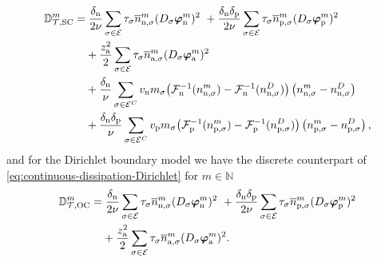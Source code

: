 \documentclass[10pt,a4paper, final]{article}
\newcommand{\reviewerTwo}[1]{\textcolor{black}{#1}}
\def\electrons{\text{n}}
\def\holes{\text{p}}
\def\ions{\text{a}}
\theoremstyle{definition}								%
\numberwithin{equation}{section}
\numberwithin{figure}{section}
\numberwithin{theorem}{section}
\begin{document}
\begin{equation} \label{eq:discrete-dissip-Schottky}
    \begin{split}
        \mathbb{D}_{\mathcal{T}, \reviewerTwo{\text{SC}}}^m
        =&\;  \frac{\delta_\electrons}{2\nu}  \sum_{ \sigma \in \mathcal{E} } \tau_\sigma  \overline{n}^{m}_{\electrons, \sigma}  (D_{\sigma} \boldsymbol{\varphi}_{\electrons}^m)^2
        ~
        + \frac{ \delta_\electrons \delta_\holes}{2\nu}  \sum_{ \sigma \in \mathcal{E} } \tau_\sigma  \overline{n}^{m}_{\holes, \sigma}  (D_{\sigma} \boldsymbol{\varphi}_{\holes}^m)^2\\
        ~
        &+ \frac{ z_{\ions}^2}{2}\sum_{\sigma \in \mathcal{E}} \tau_\sigma \overline{n}^{m}_{\ions,\sigma}  (D_{ \sigma} \boldsymbol{\varphi}_{\ions}^m)^2\\
        ~
        &+ \frac{\delta_\electrons}{\nu} \sum_{\sigma \in \mathcal{E}^C}  v_\electrons  m_\sigma  \bigl( \mathcal{F}^{-1}_\electrons (n_{\electrons, \sigma}^m) - \mathcal{F}^{-1}_\electrons  (n_{\electrons, \sigma}^D)  \bigr)  \left( n_{\electrons, \sigma}^m - n_{\electrons, \sigma}^D \right) \\
        ~
        &+ \frac{\delta_\electrons\delta_\holes}{\nu} \sum_{\sigma \in \mathcal{E}^C} v_\holes m_\sigma  \bigl(\mathcal{F}^{-1}_\holes (n_{\holes, \sigma}^m) - \mathcal{F}^{-1}_\holes  (n_{\holes, \sigma}^D)  \bigr)  \left( n_{\holes, \sigma}^m - n_{\holes, \sigma}^D \right),
    \end{split}
\end{equation}
and for the Dirichlet boundary model we have the discrete counterpart of \eqref{eq:continuous-dissipation-Dirichlet} for $m \in \mathbb{N}$
\begin{equation} \label{eq:discrete-dissip-Dirichlet}
    \begin{split}
        \mathbb{D}_{\mathcal{T}, \reviewerTwo{\text{OC}}}^m
        =&\;  \frac{\delta_\electrons}{2\nu}  \sum_{\sigma \in \mathcal{E}} \tau_\sigma  \overline{n}^{m}_{\electrons, \sigma}  (D_{\sigma} \boldsymbol{\varphi}_{\electrons}^m)^2
        ~
        + \frac{ \delta_\electrons \delta_\holes}{2\nu}  \sum_{\sigma \in \mathcal{E}} \tau_\sigma  \overline{n}^{m}_{\holes, \sigma}  (D_{\sigma} \boldsymbol{\varphi}_{\holes}^m)^2\\
        ~
        &+ \frac{ z_{\ions}^2}{2}\sum_{\sigma \in \mathcal{E}} \tau_\sigma \overline{n}^{m}_{\ions,\sigma}  (D_{ \sigma} \boldsymbol{\varphi}_{\ions}^m)^2.
    \end{split}
\end{equation}
\end{document}
